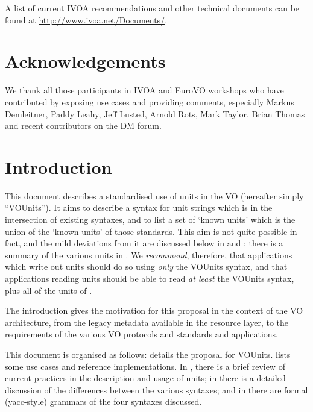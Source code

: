 \documentclass[11pt,notitlepage,onecolumn]{ivoa}
\begin{document}
A list of current IVOA recommendations and other technical documents can be found at
\url{http://www.ivoa.net/Documents/}.

\section*{Acknowledgements}

We thank all those participants in IVOA and EuroVO workshops who have
contributed by exposing use cases and providing comments, especially
Markus Demleitner,
Paddy Leahy,
Jeff Lusted,
Arnold Rots,
Mark Taylor,
Brian Thomas
and recent contributors on the DM forum.


\section{Introduction}

This document describes a standardised use of units in the VO
(hereafter simply ``VOUnits'').  It aims to describe a syntax for unit
strings which is in the intersection of existing
syntaxes, and to list a set of `known units' which is
the union of the `known units' of those standards.  This aim is not quite
possible in fact, and the mild deviations from it are discussed
below in  and ;
there is a summary of the various units in .
We \emph{recommend}, therefore, that applications which write out
units should do so using \emph{only} the VOUnits syntax, and that
applications reading units should be able to read \emph{at least} the
VOUnits syntax, plus all of the units of .

The introduction gives the motivation for
this proposal in the context of the VO architecture, from the legacy 
metadata available in the resource layer, to the requirements of the various 
VO protocols and standards and applications.

This document is organised as follows: 
details the proposal for VOUnits.  lists some
use cases and reference implementations.  In ,
there is a brief review of current practices in the description and
usage of units; in  there is a detailed
discussion of the differences between the various syntaxes; and
in  there are formal (yacc-style) grammars of
the four syntaxes discussed.
\end{document}
